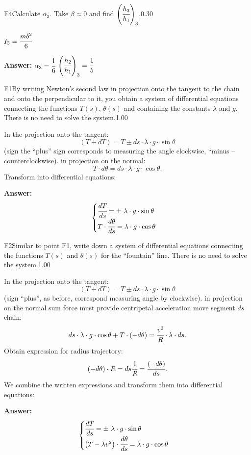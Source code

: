 \documentclass[11pt,a4paper]{article}
\begin{document}
\begin{solcard}{E4}{Calculate $\alpha_3$. Take $\beta \approx 0$ and find $\left( \cfrac{h_2}{h_1} \right)_3$.}{0.30}

$I_3 = \cfrac{mb^2}{6}$

\par\smallskip\noindent\textbf{Answer:} $\alpha_3=\cfrac{1}{6}$ $\left(\cfrac{h_2}{h_1}\right)_3 = \cfrac{1}{5}$
\end{solcard}

\begin{solcard}{F1}{By writing Newton's second law in projection onto the tangent to the chain and onto the perpendicular to it, you obtain a system of differential equations connecting the functions $T(s)$, $\theta(s)$ and containing the constants $\lambda$ and $g$. There is no need to solve the system.}{1.00}

In the projection onto the tangent: $$(T+dT) = T \pm ds \cdot \lambda \cdot g \cdot \sin \theta$$ (sign the ``plus'' sign corresponds to measuring the angle clockwise, ``minus -- counterclockwise). in projection on the normal: $$T \cdot d\theta = ds \cdot \lambda \cdot g \cdot \cos \theta.$$ Transform into differential equations:

\par\smallskip\noindent\textbf{Answer:} $$ \begin{cases} \cfrac{dT}{ds} = \pm~ \lambda \cdot g \cdot \sin \theta \\ T \cdot \cfrac{d \theta}{ds} = \lambda \cdot g \cdot \cos \theta \end{cases} $$
\end{solcard}

\begin{solcard}{F2}{Similar to point F1, write down a system of differential equations connecting the functions $T(s)$ and $\theta(s)$ for the “fountain” line. There is no need to solve the system.}{1.00}

In the projection onto the tangent: $$(T+dT) = T \pm ds \cdot \lambda \cdot g \cdot \sin \theta$$ (sign ``plus'', as before, correspond measuring angle by clockwise). in projection on the normal sum force must provide centripetal acceleration move segment $ds$ chain: $$ds \cdot \lambda \cdot g \cdot \cos \theta + T \cdot (-d\theta) = \cfrac{v^2}{R} \cdot \lambda \cdot ds.$$ Obtain expression for radius trajectory: $$(-d \theta) \cdot R = ds \\ \cfrac{1}{R} = \cfrac{(-d \theta)}{ds}.$$ We combine the written expressions and transform them into differential equations:

\par\smallskip\noindent\textbf{Answer:} $$ \begin{cases} \cfrac{dT}{ds} = \pm~ \lambda \cdot g \cdot \sin \theta \\ \left( T - \lambda v^2 \right) \cdot \cfrac{d \theta}{ds} = \lambda \cdot g \cdot \cos \theta \end{cases} $$
\end{solcard}
\end{document}
